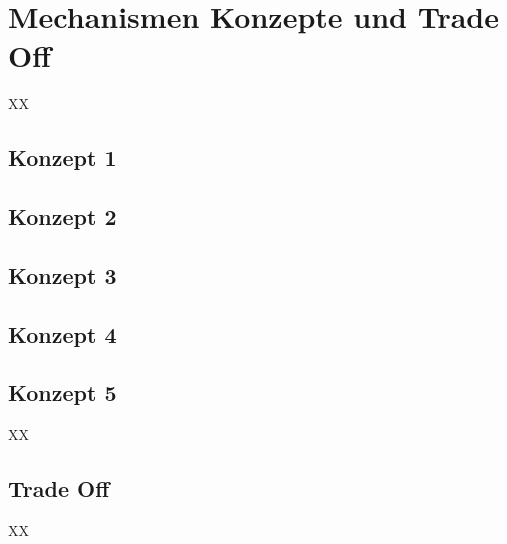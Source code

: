 \newpage
\chapter{Mechanismen Konzepte und Trade Off}
XX


\section{Konzept 1}
\section{Konzept 2}
\section{Konzept 3}
\section{Konzept 4}
\section{Konzept 5}


XX

\section{Trade Off}
XX